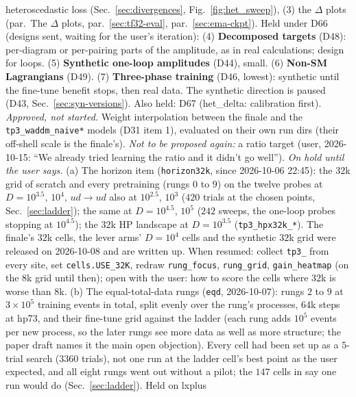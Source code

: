 \documentclass[11pt]{article}
\newcommand{\code}[1]{\texttt{#1}}
\begin{document}
\begin{itemize}
    heteroscedastic loss (Sec.~\ref{sec:divergences}, Fig.~\ref{fig:het_sweep}), (3) the $\Delta$ plots
    (par.\ The $\Delta$ plots, par.~\ref{sec:tf32-eval}, par.~\ref{sec:ema-ckpt}). Held under D66 (designs sent, waiting for the user's
    iteration): (4) \textbf{Decomposed targets} (D48): per-diagram or per-pairing parts of the amplitude, as in real
    calculations; design for loops. (5) \textbf{Synthetic one-loop amplitudes} (D44), small. (6) \textbf{Non-SM
    Lagrangians} (D49). (7) \textbf{Three-phase training} (D46, lowest): synthetic until the fine-tune benefit stops,
    then real data. The synthetic direction is paused (D43, Sec.~\ref{sec:syn-versions}). Also held: D67 (het\_delta:
    calibration first).
    \emph{Approved, not started.} Weight interpolation between the finale and the \code{tp3\_waddm\_naive*} models
    (D31 item 1), evaluated on their own run dirs (their off-shell scale is the finale's).
    \emph{Not to be proposed again:} a ratio target (user, 2026-10-15: ``We already tried learning the ratio and it
    didn't go well'').
    \emph{On hold until the user says.} (a) The horizon item (\code{horizon32k}, since 2026-10-06 22:45): the $32$k grid of
    scratch and every pretraining (rungs $0$ to $9$) on the twelve probes at $D=10^{3.5}$, $10^4$, $ud\to ud$ also at
    $10^{2.5}$, $10^3$ ($420$ trials at the chosen points, Sec.~\ref{sec:ladder}); the same at $D=10^{4.5}$, $10^5$ ($242$
    sweeps, the one-loop probes stopping at $10^{4.5}$); the $32$k HP landscape at $D=10^{3.5}$ (\code{tp3\_hpx32k\_*}).
    The finale's $32$k cells, the lever arms' $D=10^4$ cells and the synthetic $32$k grid were released on 2026-10-08 and
    are written up. When resumed: collect \code{tp3\_} from every site, set \code{cells.USE\_32K}, redraw
    \code{rung\_focus}, \code{rung\_grid}, \code{gain\_heatmap} (on the $8$k grid until then); open with the user: how to
    score the cells where $32$k is worse than $8$k. (b) The equal-total-data rungs (\code{eqd}, 2026-10-07): rungs
    $2$ to $9$ at $3\times10^5$ training events in total, split evenly over the rung's processes, $64$k steps at hp73, and
    their fine-tune grid against the ladder (each rung adds $10^5$ events per new process, so the later rungs see more
    data as well as more structure; the paper draft names it the main open objection). Every cell had been set up as a
    $5$-trial search ($3360$ trials), not one run at the ladder cell's best point as the user expected, and all eight
    rungs went out without a pilot; the $147$ cells in say one run would do (Sec.~\ref{sec:ladder}). Held on lxplus

\end{itemize}
\end{document}

